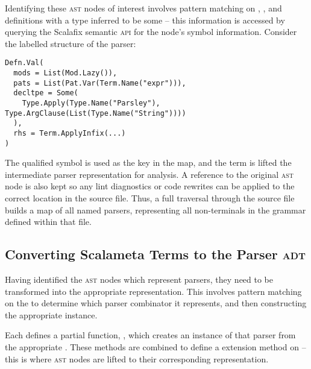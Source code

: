 \documentclass[../../main.tex]{subfiles}
\begin{document}
Identifying these \textsc{ast} nodes of interest involves pattern matching on , , and  definitions with a type inferred to be some  -- this information is accessed by querying the Scalafix semantic \textsc{api} for the node's symbol information.
Consider the labelled  structure of the  parser:
\begin{verbatim}
Defn.Val(
  mods = List(Mod.Lazy()),
  pats = List(Pat.Var(Term.Name("expr"))),
  decltpe = Some(
    Type.Apply(Type.Name("Parsley"), Type.ArgClause(List(Type.Name("String"))))
  ),
  rhs = Term.ApplyInfix(...)
)
\end{verbatim}
%
The qualified symbol  is used as the key in the map, and the  term is lifted the intermediate parser representation for analysis.
A reference to the original \textsc{ast} node is also kept so any lint diagnostics or code rewrites can be applied to the correct location in the source file.
Thus, a full traversal through the source file builds a map of all named parsers, representing all non-terminals in the grammar defined within that file.

\subsection{Converting Scalameta Terms to the Parser \textsc{adt}}
Having identified the \textsc{ast} nodes which represent parsers, they need to be transformed into the appropriate  representation.
This involves pattern matching on the  to determine which parser combinator it represents, and then constructing the appropriate  instance.

Each  defines a partial function, , which creates an instance of that parser from the appropriate .
These  methods are combined to define a  extension method on  -- this is where \textsc{ast} nodes are lifted to their corresponding  representation.
\end{document}
